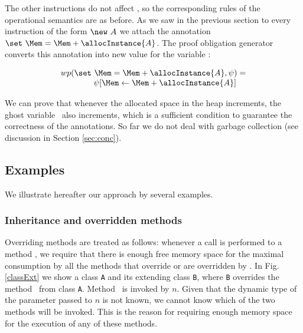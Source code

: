 The other instructions do not affect \Mem, so the corresponding rules of the operational semantics are as before. As we saw in the previous section to every
instruction of the form $\new\ A$ we attach the annotation $\set\ \Mem = \Mem + \allocInstance{A}$. The proof obligation generator converts this annotation into new value for the variable \Mem:

$$
\begin{array}{l}
wp(\set \ \Mem = \Mem + \allocInstance{A}, \psi) = \\
\ \ \ \ \ \ \ \ \ \ \ \ \psi[ \Mem \leftarrow \Mem + \allocInstance{A} ]
\end{array}
$$

We can prove that whenever the allocated space in the heap increments, 
the ghost variable \Mem\ also increments, which is a sufficient condition to guarantee the correctness of the annotations. 
So far we do not deal with garbage collection (see discussion in Section \ref{sec:conc}).

\subsection{Examples}
We illustrate hereafter our approach by several examples. 

\subsubsection{Inheritance and overridden methods} Overriding methods are treated as follows: whenever a call is performed to a method \method,
we require that there is enough free memory space for the maximal
consumption by all the  methods that override or are overridden by
\method. In Fig. \ref{classExt} we show a class \verb!A! and its
extending class \verb!B!, where \verb!B! overrides the method \method\ from class \verb!A!. Method \method\ is invoked by $n$. Given that the dynamic type of the parameter passed to $n$ is not known, we cannot know which of the two
methods will be invoked. This is the reason for requiring enough memory space for the execution of any of these methods.

